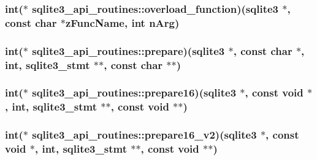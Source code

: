 \hypertarget{structsqlite3__api__routines_aae9b181f076ae18804590924aa791101}{
\subsubsection[{overload\-\_\-function}]{\setlength{\rightskip}{0pt plus 5cm}int($\ast$ sqlite3\-\_\-api\-\_\-routines\-::overload\-\_\-function)({\bf sqlite3} $\ast$, const char $\ast$z\-Func\-Name, int n\-Arg)}}\label{structsqlite3__api__routines_aae9b181f076ae18804590924aa791101}
\hypertarget{structsqlite3__api__routines_a6d5170ffef9564b7f9b157a14df4fd4d}{
\subsubsection[{prepare}]{\setlength{\rightskip}{0pt plus 5cm}int($\ast$ sqlite3\-\_\-api\-\_\-routines\-::prepare)({\bf sqlite3} $\ast$, const char $\ast$, int, {\bf sqlite3\-\_\-stmt} $\ast$$\ast$, const char $\ast$$\ast$)}}\label{structsqlite3__api__routines_a6d5170ffef9564b7f9b157a14df4fd4d}
\hypertarget{structsqlite3__api__routines_a3877cfcfebeb05e357317ab50a47e52e}{
\subsubsection[{prepare16}]{\setlength{\rightskip}{0pt plus 5cm}int($\ast$ sqlite3\-\_\-api\-\_\-routines\-::prepare16)({\bf sqlite3} $\ast$, const void $\ast$, int, {\bf sqlite3\-\_\-stmt} $\ast$$\ast$, const void $\ast$$\ast$)}}\label{structsqlite3__api__routines_a3877cfcfebeb05e357317ab50a47e52e}
\hypertarget{structsqlite3__api__routines_aa2ac35f69a60c329e4129dd67f7c5662}{
\subsubsection[{prepare16\-\_\-v2}]{\setlength{\rightskip}{0pt plus 5cm}int($\ast$ sqlite3\-\_\-api\-\_\-routines\-::prepare16\-\_\-v2)({\bf sqlite3} $\ast$, const void $\ast$, int, {\bf sqlite3\-\_\-stmt} $\ast$$\ast$, const void $\ast$$\ast$)}}\label{structsqlite3__api__routines_aa2ac35f69a60c329e4129dd67f7c5662}
